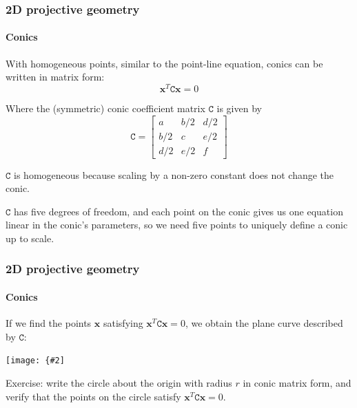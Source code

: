 \documentclass[aspectratio=169]{beamer}
\renewcommand{\vec}[1]{\boldsymbol{#1}}
\newcommand{\mat}[1]{\mathtt{#1}}
\newcommand{\myfig}[3]{\centerline{\texttt{[image: \{\#2]}}}
\begin{document}
\begin{frame}
\frametitle{2D projective geometry}
\framesubtitle{Conics}

With homogeneous points, similar to the point-line equation, conics
can be written in matrix form:
\begin{equation*}
\vec{x}^T\mat{C}\vec{x}=0
\end{equation*}

\medskip

Where the (symmetric) conic coefficient matrix $\mat{C}$ is given by
\begin{equation*}
\mat{C}=\begin{bmatrix}
a & b/2 & d/2 \\
b/2 & c & e/2 \\
d/2 & e/2 & f \end{bmatrix}
\end{equation*}

\medskip

$\mat{C}$ is \alert{homogeneous} because scaling by a non-zero
constant does not change the conic.

\medskip

$\mat{C}$ has five degrees of freedom, and each point on the conic
gives us one equation linear in the conic's parameters, so we need
five points to uniquely define a conic up to scale.

\end{frame}

\begin{frame}
\frametitle{2D projective geometry}
\framesubtitle{Conics}

If we find the points $\vec{x}$ satisfying
$\vec{x}^T\mat{C}\vec{x}=0$, we obtain the plane curve described by
$\mat{C}$:

\medskip

\myfig{1.9in}{HZ-fig1-2a}{\begin{minipage}{2.5in} \centering Solution of
    $\vec{x}^T\mat{C}\vec{x}=0$\\
Hartley and Zisserman (2004), Fig.\ 2.2(a) \end{minipage}}

\medskip

\alert{Exercise}: write the circle about the origin with radius $r$ in conic
matrix form, and verify that the points on the circle satisfy
$\vec{x}^T\mat{C}\vec{x}=0$.

\end{frame}
\end{document}
